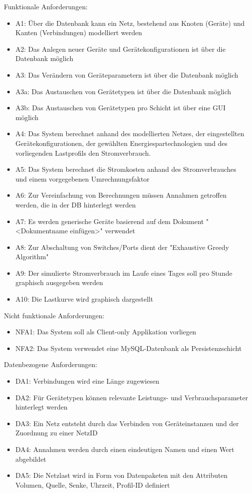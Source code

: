 \documentclass[12pt,titlepage]{article}
\begin{document}
Funktionale Anforderungen:
\begin{itemize}
	\item A1: Über die Datenbank kann ein Netz, bestehend aus Knoten (Geräte) und Kanten (Verbindungen) modelliert werden
	\item A2: Das Anlegen neuer Geräte und Gerätekonfigurationen ist über die Datenbank möglich
	\item A3: Das Verändern von Geräteparametern ist über die Datenbank möglich
	\item A3a: Das Austauschen von Gerätetypen ist über die Datenbank möglich
	\item A3b: Das Austauschen von Gerätetypen pro Schicht ist über eine GUI möglich                       
	\item A4: Das System berechnet anhand des modellierten Netzes, der eingestellten		 Gerätekonfigurationen, der gewählten Energiespartechnologien und des vorliegenden Lastprofils den Stromverbrauch.
	\item A5: Das System berechnet die Stromkosten anhand des Stromverbrauches und einem vorgegebenen Umrechnungsfaktor 
	\item A6: Zur Vereinfachung von Berechnungen müssen Annahmen getroffen werden, die in der DB hinterlegt werden
	\item A7: Es werden generische Geräte basierend auf dem Dokument "<Dokumentname einfügen>" verwendet
	\item A8: Zur Abschaltung von Switches/Ports dient der "Exhaustive Greedy Algorithm"
	\item A9: Der simulierte Stromverbrauch im Laufe eines Tages soll pro Stunde graphisch ausgegeben werden
	\item A10: Die Lastkurve wird graphisch dargestellt
\end{itemize}


Nicht funktionale Anforderungen:
\begin{itemize}
	\item NFA1: Das System soll als Client-only Applikation vorliegen
	\item NFA2: Das System verwendet eine MySQL-Datenbank als Persistenzschicht
\end{itemize}


Datenbezogene Anforderungen:
\begin{itemize}
	\item DA1: Verbindungen wird eine Länge zugewiesen
	\item DA2: Für Gerätetypen können relevante Leistungs- und Verbrauchsparameter hinterlegt werden
	\item DA3: Ein Netz entsteht durch das Verbinden von Geräteinstanzen und der Zuordnung zu einer NetzID
	\item DA4: Annahmen werden durch einen eindeutigen Namen und einen Wert abgebildet
	\item DA5:  Die Netzlast wird in Form von Datenpaketen mit den Attributen Volumen, Quelle, Senke, Uhrzeit, Profil-ID definiert
\end{itemize}
\end{document}
